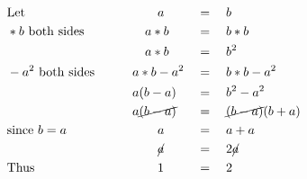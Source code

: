 \begin{alignat*}{3}
&\mathrm{Let}&&\qquad a&&=\quad b\\
&*b~\mathrm{both~sides}&&\quad a*b&&=\quad b*b\\
&\,&&\quad a*b&&=\quad b^2\\
&-a^2~\mathrm{both~sides}\qquad&& a*b-a^2&&=\quad b*b-a^2\\
&\,&&a(b-a)&&=\quad b^2-a^2\\
&\,&&a\cancel{(b-a)}&&=\quad\cancel{(b-a)}(b+a)\\
&\mathrm{since}~b=a&&\qquad a&&=\quad a+a\\
&\,&&\qquad\cancel{a}&&=\quad2\cancel{a}\\
&\mathrm{Thus}&&\qquad1&&=\quad2
\end{alignat*}
